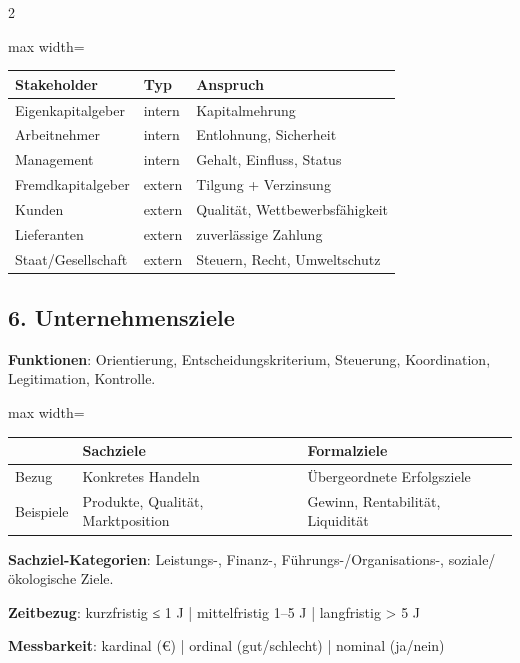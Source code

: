 \documentclass[10pt, a4paper]{article}
\begin{document}
\begin{multicols}{2}
{\small
\begin{adjustbox}{max width=\linewidth}
{\scriptsize
\begin{tabular}{lll}
\toprule
\textbf{Stakeholder} & \textbf{Typ} & \textbf{Anspruch} \\
\midrule
Eigenkapitalgeber & intern & Kapitalmehrung \\
Arbeitnehmer & intern & Entlohnung, Sicherheit \\
Management & intern & Gehalt, Einfluss, Status \\
Fremdkapitalgeber & extern & Tilgung + Verzinsung \\
Kunden & extern & Qualität, Wettbewerbsfähigkeit \\
Lieferanten & extern & zuverlässige Zahlung \\
Staat/Gesellschaft & extern & Steuern, Recht, Umweltschutz \\
\bottomrule
\end{tabular}
}
\end{adjustbox}
}



\subsection{6. Unternehmensziele}

\textbf{Funktionen}: Orientierung, Entscheidungskriterium, Steuerung, Koordination, Legitimation, Kontrolle.



{\small
\begin{adjustbox}{max width=\linewidth}
{\scriptsize
\begin{tabular}{lll}
\toprule
\textbf{} & \textbf{Sachziele} & \textbf{Formalziele} \\
\midrule
Bezug & Konkretes Handeln & Übergeordnete Erfolgsziele \\
Beispiele & Produkte, Qualität, Marktposition & Gewinn, Rentabilität, Liquidität \\
\bottomrule
\end{tabular}
}
\end{adjustbox}
}


\textbf{Sachziel-Kategorien}: Leistungs-, Finanz-, Führungs-/Organisations-, soziale/ökologische Ziele.


\textbf{Zeitbezug}: kurzfristig ≤ 1 J | mittelfristig 1–5 J | langfristig > 5 J

\textbf{Messbarkeit}: kardinal (€) | ordinal (gut/schlecht) | nominal (ja/nein)


\end{multicols}
\end{document}
